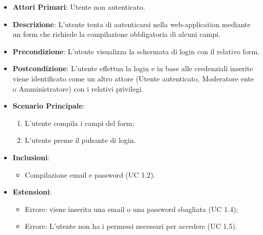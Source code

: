 		\begin{itemize}
			\item \textbf{Attori Primari}: Utente non autenticato.
			\item \textbf{Descrizione}: L'utente tenta di autenticarsi nella web-application mediante un form che richiede la compilazione obbligatoria di alcuni campi.
			\item \textbf{Precondizione}: L'utente visualizza la schermata di login con il relativo form.
			\item \textbf{Postcondizione}: L'utente effettua la login e in base alle credenziali inserite viene identificato come un altro attore (Utente autenticato, Moderatore ente o Amministratore) con i relativi privilegi.
			\item \textbf{Scenario Principale}:
			\begin{enumerate}
				\item L'utente compila i campi del form;
				\item L'utente preme il pulsante di login.
			\end{enumerate}
			\item \textbf{Inclusioni}:
				\begin{itemize}
					\item Compilazione email e password (UC 1.2).
				\end{itemize}
			\item \textbf{Estensioni}:
				\begin{itemize}
					\item Errore: viene inserita una email o una password sbagliata (UC 1.4);
					\item Errore: L'utente non ha i permessi necessari per accedere (UC 1.5).
				\end{itemize}
		\end{itemize}

